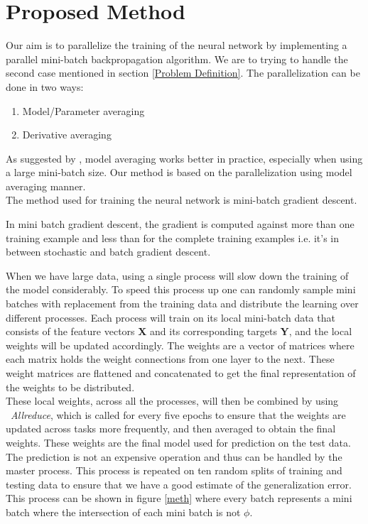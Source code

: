 \documentclass{sig-alternate-05-2015}
\begin{document}
\section{Proposed Method} \label{PM}
Our aim is to parallelize the training of the neural network by implementing a parallel mini-batch backpropagation algorithm. We are to trying to handle the second case mentioned in section \ref{Problem Definition}. The parallelization can be done in two ways:
\begin{enumerate}
\item Model/Parameter averaging
\item Derivative averaging
\end{enumerate}
As suggested by \cite{su2015experiments}, model averaging works better in practice, especially when using a large mini-batch size. Our method is based on the parallelization using model averaging manner. \\
The method used for training the neural network is mini-batch gradient descent.
\begin{definition}
In mini batch gradient descent, the gradient is computed against more than one training example and less than for the complete training examples i.e. it's in between stochastic and batch gradient descent.
\end{definition}
When we have large data, using a single process will slow down the training of the model considerably. To speed this process up one can randomly sample mini batches with replacement from the training data and distribute the learning over different processes. Each process will train on its local mini-batch data that consists of the feature vectors \textbf{X} and its corresponding targets \textbf{Y}, and the local weights will be updated accordingly. The weights are a vector of matrices where each matrix holds the weight connections from one layer to the next. These weight matrices are flattened and concatenated to get the final representation of the weights to be distributed.\\
These local weights, across all the processes, will then be combined by using \
\textit{Allreduce}, which is called for every five epochs to ensure that the weights are updated across tasks more frequently, and then averaged to obtain the final weights. These weights are the final model used for prediction on the test data. The prediction is not an expensive operation and thus can be handled by the master process. This process is repeated on ten random splits of training and testing data to ensure that we have a good estimate of the generalization error. This process can be shown in figure \ref{meth} where every batch represents a mini batch where the intersection of each mini batch is not $\phi$. 
\end{document}
